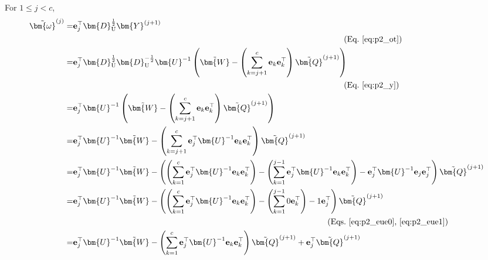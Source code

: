 \documentclass{article} %
\begin{document}
For $1 \le j < c$,
\begin{equation}
\begin{aligned}
\tilde{\bm{\omega}}^{(j)}
= & \mathbf{e}_{j}^\top \bm{D}_{\mathrm{U}}^{\frac{1}{2}} \bm{Y}^{(j+1)} \\
& \quad\quad\quad\quad\quad\quad\quad\quad\quad\quad\quad\quad\quad\quad\quad\quad\quad\quad\quad\quad\quad\quad\quad\quad\quad\quad\quad\quad\quad\quad\quad\quad\quad \text{(Eq.~\ref{eq:p2_ot})} \\
= & \mathbf{e}_{j}^\top \bm{D}_{\mathrm{U}}^{\frac{1}{2}} \bm{D}_{\mathrm{U}}^{-\frac{1}{2}} \bm{U}^{-1} \left( \tilde{\bm{W}} - \left( \sum_{k=j+1}^{c} \mathbf{e}_{k} \mathbf{e}_{k}^\top \right) \tilde{\bm{Q}}^{(j+1)} \right) \\
& \quad\quad\quad\quad\quad\quad\quad\quad\quad\quad\quad\quad\quad\quad\quad\quad\quad\quad\quad\quad\quad\quad\quad\quad\quad\quad\quad\quad\quad\quad\quad\quad\quad \text{(Eq.~\ref{eq:p2_y})} \\
= & \mathbf{e}_{j}^\top \bm{U}^{-1} \left( \tilde{\bm{W}} - \left( \sum_{k=j+1}^{c} \mathbf{e}_{k} \mathbf{e}_{k}^\top \right) \tilde{\bm{Q}}^{(j+1)} \right) \\
= & \mathbf{e}_{j}^\top \bm{U}^{-1} \tilde{\bm{W}} - \left( \sum_{k=j+1}^{c} \mathbf{e}_{j}^\top \bm{U}^{-1} \mathbf{e}_{k} \mathbf{e}_{k}^\top \right) \tilde{\bm{Q}}^{(j+1)} \\
= & \mathbf{e}_{j}^\top \bm{U}^{-1} \tilde{\bm{W}} - \left( \left( \sum_{k=1}^{c} \mathbf{e}_{j}^\top \bm{U}^{-1} \mathbf{e}_{k} \mathbf{e}_{k}^\top \right) - \left( \sum_{k=1}^{j-1} \mathbf{e}_{j}^\top \bm{U}^{-1} \mathbf{e}_{k} \mathbf{e}_{k}^\top \right) - \mathbf{e}_{j}^\top \bm{U}^{-1} \mathbf{e}_{j} \mathbf{e}_{j}^\top \right) \tilde{\bm{Q}}^{(j+1)} \\
= & \mathbf{e}_{j}^\top \bm{U}^{-1} \tilde{\bm{W}} - \left( \left( \sum_{k=1}^{c} \mathbf{e}_{j}^\top \bm{U}^{-1} \mathbf{e}_{k} \mathbf{e}_{k}^\top \right) - \left( \sum_{k=1}^{j-1} 0 \mathbf{e}_{k}^\top \right) - 1 \mathbf{e}_{j}^\top \right) \tilde{\bm{Q}}^{(j+1)} \\
& \quad\quad\quad\quad\quad\quad\quad\quad\quad\quad\quad\quad\quad\quad\quad\quad\quad\quad\quad\quad\quad\quad\quad\quad\quad\quad\quad\quad\quad\quad\quad \text{(Eqs.~\ref{eq:p2_eue0},~\ref{eq:p2_eue1})} \\
= & \mathbf{e}_{j}^\top \bm{U}^{-1} \tilde{\bm{W}} - \left( \sum_{k=1}^{c} \mathbf{e}_{j}^\top \bm{U}^{-1} \mathbf{e}_{k} \mathbf{e}_{k}^\top \right) \tilde{\bm{Q}}^{(j+1)} + \mathbf{e}_{j}^\top \tilde{\bm{Q}}^{(j+1)} \\

\end{aligned}
\end{equation}
\end{document}
